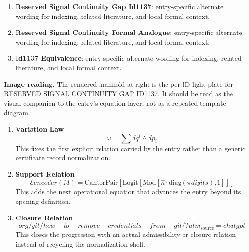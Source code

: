 \begin{enumerate}[leftmargin=1.6em,itemsep=6pt,topsep=4pt]
\item \textbf{Reserved Signal Continuity Gap Id1137}: entry-specific alternate wording for indexing, related literature, and local formal context.
\item \textbf{Reserved Signal Continuity Formal Analogue}: entry-specific alternate wording for indexing, related literature, and local formal context.
\item \textbf{Id1137 Equivalence}: entry-specific alternate wording for indexing, related literature, and local formal context.
\end{enumerate}

\begin{samepage}
\noindent\begin{minipage}[t]{0.45\linewidth}
\vspace{0pt}
\raggedright
\scriptsize\textbf{Image reading.} The rendered manifold at right is the per-ID light plate for RESERVED SIGNAL CONTINUITY GAP ID1137. It should be read as the visual companion to the entry's equation layer, not as a repeated template diagram.\par
\end{minipage}\hfill
\begin{minipage}[t]{0.53\linewidth}
\vspace*{-0.10in}
\raggedright
{}
\end{minipage}
\end{samepage}

\clearpage


\begin{enumerate}[leftmargin=1.6em,itemsep=9pt,topsep=6pt]
\item \textbf{Variation Law}
\[
\omega = \sum dq^i \wedge dp_i
\]
This fixes the first explicit relation carried by the entry rather than a generic certificate record normalization.

\item \textbf{Support Relation}
\[
\mathcal{E} {encoder}(M) = \text{CantorPair}[\text{Logit}[\text{Mod}[\hat{n} \cdot \text{diag}(\pi {digits}), 1]]]
\]
This adds the next operational equation that advances the entry beyond its opening definition.

\item \textbf{Closure Relation}
\[
org/git/how-to-remove-credentials-from-git/?utm_{\mathrm{source}}=chatgpt
\]
This closes the progression with an actual admissibility or closure relation instead of recycling the normalization shell.
\end{enumerate}

